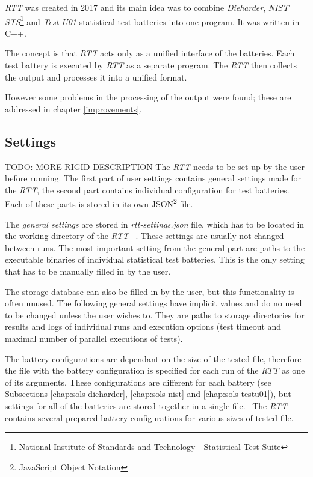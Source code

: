 \documentclass[
  digital,     %
  oneside,     %
  nosansbold,  %
  nocolorbold, %
  nolof,         %
  nolot,         %
]{fithesis4}
\begin{document}
\emph{RTT} was created in 2017 and its main idea was to combine \emph{Dieharder}, \emph{NIST STS}\footnote{National Institute of Standards and Technology - Statistical Test Suite} and \emph{Test U01} statistical test batteries into one program. It was written in C++. 

The concept is that \emph{RTT} acts only as a unified interface of the batteries. Each test battery is executed by \emph{RTT} as a separate program. The \emph{RTT} then collects the output and processes it into a unified format.~\cite[p.~8]{rtt-obratil}

However some problems in the processing of the output were found; these are addressed in chapter \ref{improvements}.

\subsection{Settings}\label{rtt-settings} 
TODO: MORE RIGID DESCRIPTION
The \emph{RTT} needs to be set up by the user before running. The first part of user settings contains general settings made for the \emph{RTT}, the second part contains individual configuration for test batteries. Each of these parts is stored in its own JSON\footnote{JavaScript Object Notation} file. 

The \emph{general settings} are stored in \emph{rtt-settings.json} file, which has to be located in the working directory of the \emph{RTT}~\cite[p.~10]{rtt-obratil} . These settings are usually not changed between runs.
The most important setting from the general part are paths to the executable binaries of individual statistical test batteries. This is the only setting that has to be manually filled in by the user.

The storage database can also be filled in by the user, but this functionality is often unused. The following general settings have implicit values and do no need to be changed unless the user wishes to. They are paths to storage directories for results and logs of individual runs and execution options (test timeout and maximal number of parallel executions of tests). 

 The battery configurations are dependant on the size of the tested file, therefore the file with the battery configuration is specified for each run of the \emph{RTT} as one of its arguments. These configurations are different for each battery (see Subsections \ref{chap:sols-dieharder}, \ref{chap:sols-nist} and \ref{chap:sols-testu01}), but settings for all of the batteries are stored together in a single file.~\cite[p.~11]{rtt-obratil}  The \emph{RTT} contains several prepared battery configurations for various sizes of tested file.
\end{document}
